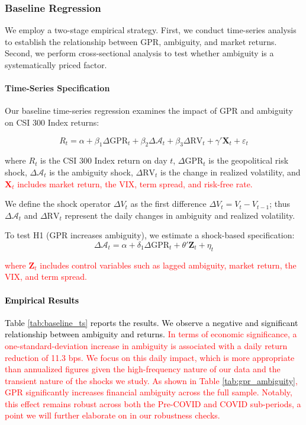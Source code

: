 \documentclass[preprint,12pt,authoryear]{elsarticle}
\begin{document}
\subsubsection{Baseline Regression}

We employ a two-stage empirical strategy. First, we conduct time-series analysis to establish the relationship between GPR, ambiguity, and market returns. Second, we perform cross-sectional analysis to test whether ambiguity is a systematically priced factor.

\paragraph{Time-Series Specification}
Our baseline time-series regression examines the impact of GPR and ambiguity on CSI 300 Index returns:

\begin{equation}
R_{t} = \alpha + \beta_1 \Delta \text{GPR}_{t} + \beta_2 \Delta \mathcal{A}_{t} + \beta_3 \Delta \text{RV}_{t} + \gamma' \mathbf{X}_{t} + \varepsilon_{t}
\end{equation}

where $R_t$ is the CSI 300 Index return on day $t$, $\Delta \text{GPR}_t$ is the geopolitical risk shock, $\Delta \mathcal{A}_t$ is the ambiguity shock, $\Delta \text{RV}_t$ is the change in realized volatility, and \textcolor{red}{$\mathbf{X}_t$ includes market return, the VIX, term spread, and risk-free rate.}

We define the shock operator $\Delta V_t$ as the first difference $\Delta V_t = V_t - V_{t-1}$; thus $\Delta \mathcal{A}_t$ and $\Delta \text{RV}_t$ represent the daily changes in ambiguity and realized volatility.

To test H1 (GPR increases ambiguity), we estimate a shock-based specification:
\begin{equation}
\Delta \mathcal{A}_{t} = \alpha + \delta_1 \Delta \text{GPR}_{t} + \theta' \mathbf{Z}_{t} + \eta_{t}
\end{equation}

\textcolor{red}{where $\mathbf{Z}_t$ includes control variables such as lagged ambiguity, market return, the VIX, and term spread.}

\paragraph{\textcolor{black}{Empirical Results}}
\textcolor{black}{Table \ref{tab:baseline_ts} reports the results. We observe a negative and significant relationship between ambiguity and returns.} \textcolor{red}{In terms of economic significance, a one-standard-deviation increase in ambiguity is associated with a daily return reduction of 11.3 bps. We focus on this daily impact, which is more appropriate than annualized figures given the high-frequency nature of our data and the transient nature of the shocks we study.} \textcolor{red}{As shown in Table \ref{tab:gpr_ambiguity}, GPR significantly increases financial ambiguity across the full sample. Notably, this effect remains robust across both the Pre-COVID and COVID sub-periods, a point we will further elaborate on in our robustness checks.}
\end{document}
